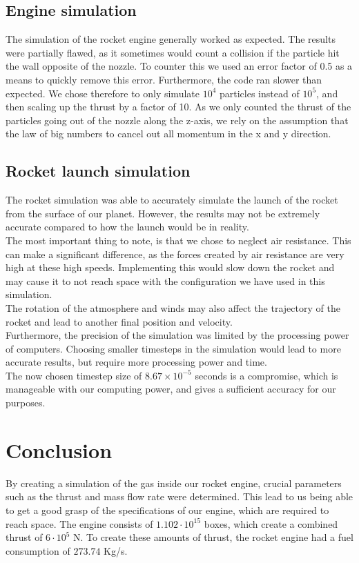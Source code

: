 \documentclass[reprint,english,notitlepage]{revtex4-2}
\begin{document}
	\subsection{Engine simulation}
	The simulation of the rocket engine generally worked as expected.
	The results were partially flawed, as it sometimes would count a collision if the particle hit the wall opposite of the nozzle.
	To counter this we used an error factor of 0.5 as a means to quickly remove this error.
	Furthermore, the code ran slower than expected.
	We chose therefore to only simulate $ 10^{4} $ particles instead of $ 10^{5} $, and then scaling up the thrust by a factor of 10.
	As we only counted the thrust of the particles going out of the nozzle along the z-axis, we rely on the assumption that the law of big numbers to cancel out all momentum in the x and y direction.\\

	\subsection{Rocket launch simulation}\label{subsec:rocket-launch-simulation}
	The rocket simulation was able to accurately simulate the launch of the rocket from the surface of our planet.
	However, the results may not be extremely accurate compared to how the launch would be in reality.\\
	The most important thing to note, is that we chose to neglect air resistance.
	This can make a significant difference, as the forces created by air resistance are very high at these high speeds.
	Implementing this would slow down the rocket and may cause it to not reach space with the configuration we have used in this simulation.\\
	The rotation of the atmosphere and winds may also affect the trajectory of the rocket and lead to another final position and velocity.\\

	Furthermore, the precision of the simulation was limited by the processing power of computers.
	Choosing smaller timesteps in the simulation would lead to more accurate results, but require more processing power and time.\\
	The now chosen timestep size of $8.67 \times 10^{-5}$ seconds is a compromise, which is manageable with our computing power, and gives a sufficient accuracy for our purposes.




\section{Conclusion}
By creating a simulation of the gas inside our rocket engine, crucial parameters such as the thrust and mass flow rate were determined.
This lead to us being able to get a good grasp of the specifications of our engine, which are required to reach space.
The engine consists of $ 1.102 \cdot 10^{15} $ boxes, which create a combined thrust of $ 6 \cdot 10^{5}$ N.
To create these amounts of thrust, the rocket engine had a fuel consumption of $273.74$ Kg/s.
\end{document}
